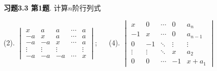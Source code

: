 \newpageorvspace

{\bf 习题3.3 第1题}. 计算$n$阶行列式

(2). $\begin{vmatrix} x & a & a & \cdots & a \\ -a & x & a & \cdots & a \\ -a & -a & x & \cdots & a \\ \vdots & \vdots & \vdots & & \vdots \\ -a & -a & -a & \cdots & x \end{vmatrix}$; $\quad$ (4). $\begin{vmatrix} x & 0 & \cdots & 0 & a_n \\ -1 & x & \cdots & 0 & a_{n-1} \\ 0 & -1 & \ddots & \vdots & \vdots \\ \vdots & \vdots & \ddots & x & a_2 \\ 0 & 0 & \cdots & -1 & x+a_1 \end{vmatrix}$


